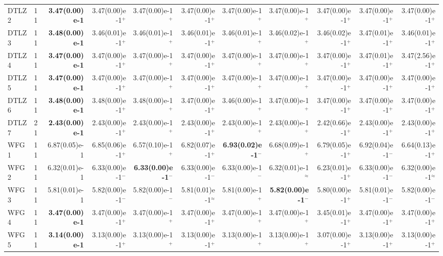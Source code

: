 \begin{longtable}{llrrrrrrrrr}
DTLZ2 & 11 & \textbf{3.47(0.00)e-1} & 3.47(0.00)e-1$^{+}$ & 3.47(0.00)e-1$^{+}$ & 3.47(0.00)e-1$^{+}$ & 3.47(0.00)e-1$^{+}$ & 3.47(0.00)e-1$^{+}$ & 3.47(0.00)e-1$^{+}$ & 3.47(0.00)e-1$^{+}$ & 3.47(0.00)e-1$^{+}$ \\
DTLZ3 & 11 & \textbf{3.48(0.00)e-1} & 3.46(0.01)e-1$^{+}$ & 3.46(0.01)e-1$^{+}$ & 3.46(0.01)e-1$^{+}$ & 3.46(0.01)e-1$^{+}$ & 3.46(0.02)e-1$^{+}$ & 3.46(0.02)e-1$^{+}$ & 3.47(0.01)e-1$^{+}$ & 3.46(0.01)e-1$^{+}$ \\
DTLZ4 & 11 & \textbf{3.47(0.00)e-1} & 3.47(0.00)e-1$^{+}$ & 3.47(0.00)e-1$^{+}$ & 3.47(0.00)e-1$^{+}$ & 3.47(0.00)e-1$^{+}$ & 3.47(0.00)e-1$^{+}$ & 3.47(0.00)e-1$^{+}$ & 3.47(0.01)e-1$^{+}$ & 3.47(2.56)e-1$^{+}$ \\
DTLZ5 & 11 & \textbf{3.47(0.00)e-1} & 3.47(0.00)e-1$^{+}$ & 3.47(0.00)e-1$^{+}$ & 3.47(0.00)e-1$^{+}$ & 3.47(0.00)e-1$^{+}$ & 3.47(0.00)e-1$^{+}$ & 3.47(0.00)e-1$^{+}$ & 3.47(0.00)e-1$^{+}$ & 3.47(0.00)e-1$^{+}$ \\
DTLZ6 & 11 & \textbf{3.48(0.00)e-1} & 3.48(0.00)e-1$^{+}$ & 3.48(0.00)e-1$^{+}$ & 3.47(0.00)e-1$^{+}$ & 3.46(0.00)e-1$^{+}$ & 3.47(0.00)e-1$^{+}$ & 3.47(0.00)e-1$^{+}$ & 3.47(0.00)e-1$^{+}$ & 3.47(0.00)e-1$^{+}$ \\
DTLZ7 & 21 & \textbf{2.43(0.00)e-1} & 2.43(0.00)e-1$^{+}$ & 2.43(0.00)e-1$^{+}$ & 2.43(0.00)e-1$^{+}$ & 2.43(0.00)e-1$^{+}$ & 2.43(0.00)e-1$^{+}$ & 2.42(0.66)e-1$^{+}$ & 2.43(0.00)e-1$^{+}$ & 2.43(0.00)e-1$^{+}$ \\
\midrule
WFG1 & 11 & 6.87(0.05)e-1 & 6.85(0.06)e-1$^{+}$ & 6.57(0.10)e-1$^{+}$ & 6.82(0.07)e-1$^{+}$ & \textbf{6.93(0.02)e-1}$^{-}$ & 6.68(0.09)e-1$^{+}$ & 6.79(0.05)e-1$^{+}$ & 6.92(0.04)e-1$^{-}$ & 6.64(0.13)e-1$^{+}$ \\
WFG2 & 11 & 6.32(0.01)e-1 & 6.33(0.00)e-1$^{-}$ & \textbf{6.33(0.00)e-1}$^{-}$ & 6.33(0.00)e-1$^{-}$ & 6.33(0.00)e-1$^{-}$ & 6.32(0.01)e-1$^{\approx}$ & 6.23(0.01)e-1$^{+}$ & 6.33(0.00)e-1$^{-}$ & 6.32(0.00)e-1$^{\approx}$ \\
WFG3 & 11 & 5.81(0.01)e-1 & 5.82(0.00)e-1$^{-}$ & 5.82(0.00)e-1$^{-}$ & 5.81(0.01)e-1$^{\approx}$ & 5.81(0.00)e-1$^{+}$ & \textbf{5.82(0.00)e-1}$^{-}$ & 5.80(0.00)e-1$^{+}$ & 5.81(0.01)e-1$^{-}$ & 5.82(0.00)e-1$^{-}$ \\
WFG4 & 11 & \textbf{3.47(0.00)e-1} & 3.47(0.00)e-1$^{+}$ & 3.47(0.00)e-1$^{+}$ & 3.47(0.00)e-1$^{+}$ & 3.47(0.00)e-1$^{+}$ & 3.47(0.00)e-1$^{+}$ & 3.45(0.01)e-1$^{+}$ & 3.47(0.00)e-1$^{+}$ & 3.47(0.00)e-1$^{+}$ \\
WFG5 & 11 & \textbf{3.14(0.00)e-1} & 3.13(0.00)e-1$^{+}$ & 3.13(0.00)e-1$^{+}$ & 3.13(0.00)e-1$^{+}$ & 3.13(0.00)e-1$^{+}$ & 3.13(0.00)e-1$^{+}$ & 3.07(0.00)e-1$^{+}$ & 3.13(0.00)e-1$^{+}$ & 3.13(0.00)e-1$^{+}$ \\

\end{longtable}
